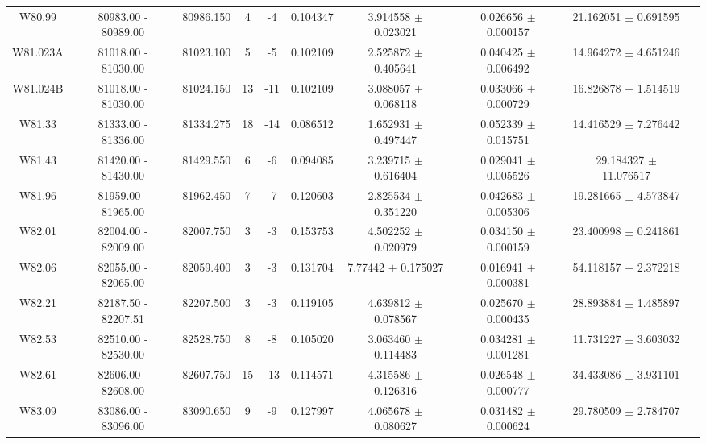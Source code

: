 \documentclass{article}
\begin{document}
\begin{table}[h]
{\begin{tabular}{|c|c|c|c|c|c|c|c|c|c|}
W80.99 & 80983.00 - 80989.00 & 80986.150 & 4 & -4 & 0.104347 & 3.914558 $\pm$ 0.023021 & 0.026656 $\pm$ 0.000157 & 21.162051 $\pm$ 0.691595 \\

W81.023A & 81018.00 - 81030.00 & 81023.100 & 5 & -5 & 0.102109 & 2.525872 $\pm$ 0.405641 & 0.040425 $\pm$ 0.006492 & 14.964272 $\pm$ 4.651246 \\

W81.024B & 81018.00 - 81030.00 & 81024.150 & 13 & -11 & 0.102109 & 3.088057 $\pm$ 0.068118 & 0.033066 $\pm$ 0.000729 & 16.826878 $\pm$ 1.514519 \\

W81.33 & 81333.00 - 81336.00 & 81334.275 & 18 & -14 & 0.086512 & 1.652931 $\pm$ 0.497447 & 0.052339 $\pm$ 0.015751 & 14.416529 $\pm$ 7.276442 \\

W81.43 & 81420.00 - 81430.00 & 81429.550 & 6 & -6 & 0.094085 & 3.239715 $\pm$ 0.616404 & 0.029041 $\pm$ 0.005526 & 29.184327 $\pm$ 11.076517 \\

W81.96 & 81959.00 - 81965.00 & 81962.450 & 7 & -7 & 0.120603 & 2.825534 $\pm$ 0.351220 & 0.042683 $\pm$ 0.005306 & 19.281665 $\pm$ 4.573847 \\

W82.01 & 82004.00 - 82009.00 & 82007.750 & 3 & -3 & 0.153753 & 4.502252 $\pm$ 0.020979 &  0.034150 $\pm$ 0.000159 & 23.400998 $\pm$ 0.241861 \\

W82.06 & 82055.00 - 82065.00 & 82059.400 & 3 & -3 & 0.131704 & 7.77442 $\pm$ 0.175027 & 0.016941 $\pm$ 0.000381 & 54.118157 $\pm$ 2.372218 \\

W82.21 & 82187.50 - 82207.51 & 82207.500 & 3 & -3 & 0.119105 & 4.639812 $\pm$ 0.078567 &  0.025670 $\pm$ 0.000435 & 28.893884 $\pm$ 1.485897 \\
         
W82.53 & 82510.00 - 82530.00 & 82528.750 & 8 & -8 & 0.105020 & 3.063460 $\pm$ 0.114483 & 0.034281 $\pm$ 0.001281 & 11.731227 $\pm$ 3.603032 \\

W82.61 & 82606.00 - 82608.00 & 82607.750 & 15 & -13 & 0.114571 & 4.315586 $\pm$ 0.126316 & 0.026548 $\pm$ 0.000777 & 34.433086 $\pm$ 3.931101 \\
         
W83.09 & 83086.00 - 83096.00 & 83090.650 & 9 & -9 & 0.127997 & 4.065678 $\pm$ 0.080627 & 0.031482 $\pm$ 0.000624 & 29.780509 $\pm$ 2.784707 \\
         

\end{tabular}}
\end{table}
\end{document}
